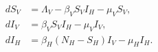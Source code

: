 \begin{equation}
   \begin{aligned}
       d S_V &= \Lambda_V - \beta_V S_V I_H - \mu_V S_V, \\
       d I_V &= \beta_V S_V I_H - \mu_V I_V, \\
       d I_H &= \beta_H (N_H - S_H) I_V - \mu_H I_H.
   \end{aligned}
\end{equation}